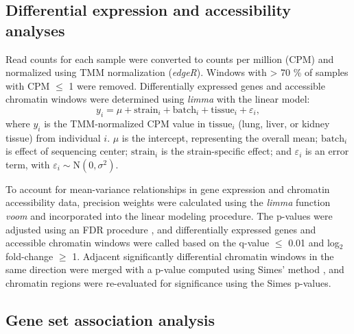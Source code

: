 
\subsection{Differential expression and accessibility analyses}

Read counts for each sample were converted to counts per million (CPM) and normalized using TMM normalization (\textit{edgeR}). Windows with > 70 \% of samples with CPM $\leq$ 1 were removed. Differentially expressed genes and accessible chromatin windows were determined using \textit{limma} \citep{limma} with the linear model:
\begin{equation}
y_{i} = \mu + \text{strain}_{i} + \text{batch}_{i} + \text{tissue}_{i} + \varepsilon_{i},
\label{eq:limma_model}
\end{equation}
where $y_{i}$ is the TMM-normalized CPM value in $\text{tissue}_{i}$ (lung, liver, or kidney tissue) from individual $i$. $\mu$ is the intercept, representing the overall mean; $\text{batch}_{i}$ is effect of sequencing center; $\text{strain}_i$ is the strain-specific effect; and $\varepsilon_{i}$ is an error term, with $\varepsilon_{i} \sim \text{N}(0, \sigma^{2})$.

To account for mean-variance relationships in gene expression and chromatin accessibility data, precision weights were calculated using the \textit{limma} function \textit{voom} and incorporated into the linear modeling procedure. The p-values were adjusted using an FDR procedure \citep{Benjamini1995}, and differentially expressed genes and accessible chromatin windows were called based on the q-value $\le$ 0.01 and log$_{2}$ fold-change $\geq$ 1. Adjacent significantly differential chromatin windows in the same direction were merged with a p-value computed using Simes' method \citep{Sarkar1997}, and chromatin regions were re-evaluated for significance using the Simes p-values.

\subsection{Gene set association analysis}

